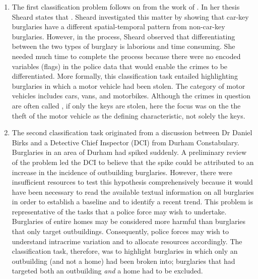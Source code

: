 \begin{enumerate}
   
\item The first classification problem follows on from the work of \parencite{sheard2020developing}. In her thesis Sheard states that . Sheard investigated this matter by showing that car-key burglaries have a different spatial-temporal pattern from non-car-key burglaries. However, in the process, Sheard observed that differentiating between the two types of burglary is laborious and time consuming. She needed much time to complete the process because there were no encoded variables (flags) in the police data that would enable the crimes to be differentiated. More formally, this classification task entailed highlighting burglaries in which a motor vehicle had been stolen. The category of motor vehicles includes cars, vans, and motorbikes. Although the crimes in question are often called , if only the keys are stolen, here the focus was on the the theft of the motor vehicle as the defining characteristic, not solely the keys.

 \item The second classification task originated from a discussion between Dr Daniel Birks and a Detective Chief Inspector (DCI) from Durham Constabulary. Burglaries in an area of Durham had spiked suddenly. A preliminary review of the problem led the DCI to believe that the spike could be attributed to an increase in the incidence of outbuilding burglaries. However, there were insufficient resources to test this hypothesis comprehensively because it would have been necessary to read the available textual information on all burglaries in order to establish a baseline and to identify a recent trend. This problem is representative of the tasks that a police force may wish to undertake. Burglaries of entire homes may be considered more harmful than burglaries that only target outbuildings. Consequently, police forces may wish to understand intracrime variation and to allocate resources accordingly. The classification task, therefore, was to highlight burglaries in which only an outbuilding (and not a home) had been broken into; burglaries that had targeted both an outbuilding \emph{and} a home had to be excluded.



\end{enumerate}
